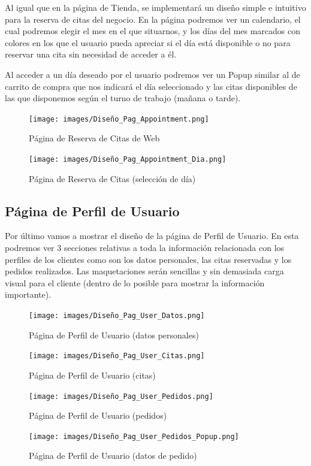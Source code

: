 Al igual que en la página de Tienda, se implementará un diseño simple e intuitivo para la reserva de citas del negocio.
En la página podremos ver un calendario, el cual podremos elegir el mes en el que situarnos, y los días del mes marcados con colores en los que el usuario pueda apreciar si el día está disponible o no para reservar una cita sin necesidad de acceder a él.

Al acceder a un día deseado por el usuario podremos ver un Popup similar al de carrito de compra que nos indicará el día seleccionado y las citas disponibles de las que disponemos según el turno de trabajo (mañana o tarde).

\begin{figure}[H]
  \centering
  \texttt{[image: images/Diseño\_Pag\_Appointment.png]}
  \caption{Página de Reserva de Citas de Web}
  \label{}
\end{figure}

\begin{figure}[H]
  \centering
  \texttt{[image: images/Diseño\_Pag\_Appointment\_Dia.png]}
  \caption{Página de Reserva de Citas (selección de día)}
  \label{}
\end{figure}

\subsection{Página de Perfil de Usuario}

Por último vamos a mostrar el diseño de la página de Perfil de Usuario. En esta podremos ver 3 secciones relativas a toda la información relacionada con los perfiles de los clientes como son los datos personales, las citas reservadas y los pedidos realizados. Las maquetaciones serán sencillas y sin demasiada carga visual para el cliente (dentro de lo posible para mostrar la información importante).

\begin{figure}[H]
  \centering
  \texttt{[image: images/Diseño\_Pag\_User\_Datos.png]}
  \caption{Página de Perfil de Usuario (datos personales)}
  \label{}
\end{figure}

\begin{figure}[H]
  \centering
  \texttt{[image: images/Diseño\_Pag\_User\_Citas.png]}
  \caption{Página de Perfil de Usuario (citas)}
  \label{}
\end{figure}

\begin{figure}[H]
  \centering
  \texttt{[image: images/Diseño\_Pag\_User\_Pedidos.png]}
  \caption{Página de Perfil de Usuario (pedidos)}
  \label{}
\end{figure}

\begin{figure}[H]
  \centering
  \texttt{[image: images/Diseño\_Pag\_User\_Pedidos\_Popup.png]}
  \caption{Página de Perfil de Usuario (datos de pedido)}
  \label{}
\end{figure}
